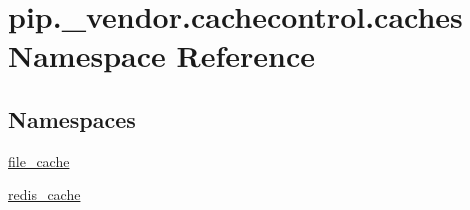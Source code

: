 \hypertarget{namespacepip_1_1__vendor_1_1cachecontrol_1_1caches}{}\section{pip.\+\_\+vendor.\+cachecontrol.\+caches Namespace Reference}
\label{namespacepip_1_1__vendor_1_1cachecontrol_1_1caches}
\subsection*{Namespaces}
\begin{DoxyCompactItemize}
\item 
 \hyperlink{namespacepip_1_1__vendor_1_1cachecontrol_1_1caches_1_1file__cache}{file\+\_\+cache}
\item 
 \hyperlink{namespacepip_1_1__vendor_1_1cachecontrol_1_1caches_1_1redis__cache}{redis\+\_\+cache}
\end{DoxyCompactItemize}
